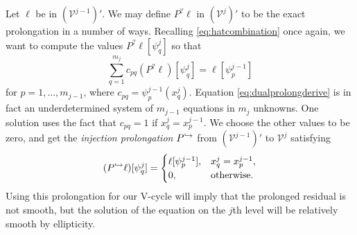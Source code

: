 \documentclass[letterpaper,final,12pt,reqno]{amsart}
\theoremstyle{claim}
\numberwithin{equation}{section}
\numberwithin{figure}{section}
\numberwithin{table}{section}
\numberwithin{theorem}{section}
\begin{document}
Let $\ell$ be in $(\mathcal{V}^{j-1})'$.  We may define $P^?\ell$ in $(\mathcal{V}^j)'$ to be the exact prolongation in a number of ways.  Recalling \eqref{eq:hatcombination} once again, we want to compute the values $P^?\ell[\psi_q^j]$ so that
\begin{equation}
  \sum_{q=1}^{m_j} c_{pq} (P^?\ell)[\psi_q^j] = \ell[\psi_p^{j-1}] \label{eq:dualprolongderive}
\end{equation}
for $p=1,\dots,m_{j-1}$, where $c_{pq} = \psi_p^{j-1}(x_q^j)$.  Equation \eqref{eq:dualprolongderive} is in fact an underdetermined system of $m_{j-1}$ equations in $m_j$ unknowns.  One solution uses the fact that $c_{pq}=1$ if $x_q^j=x_p^{j-1}$.  We choose the other values to be zero, and get the \emph{injection prolongation} $P^{\hookrightarrow}$ from $(\mathcal{V}^{j-1})'$ to $\mathcal{V}^j$ satisfying
\begin{equation}
  (P^{\hookrightarrow}\ell)[\psi_q^j] = \begin{cases} \ell[\psi_p^{j-1}], & x_q^j=x_p^{j-1}, \\
                                      0, & \text{otherwise}. \end{cases}  \label{eq:injectprolong}
\end{equation}
Using this prolongation for our V-cycle will imply that the prolonged residual is not smooth, but the solution of the equation on the $j$th level will be relatively smooth by ellipticity.
\end{document}

